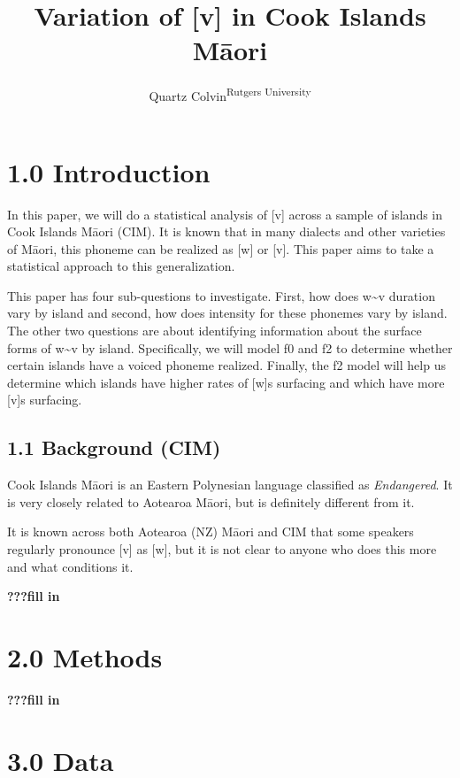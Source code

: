\documentclass[
  ,man,floatsintext]{apa6}
\title{Variation of {[}v{]} in Cook Islands Māori}
\author{Quartz Colvin\textsuperscript{Rutgers University}}
\date{}
\affiliation{\phantom{0}}
\begin{document}
\maketitle

\section{1.0 Introduction}\label{introduction}

In this paper, we will do a statistical analysis of {[}v{]} across a sample of islands in Cook Islands Māori (CIM). It is known that in many dialects and other varieties of Māori, this phoneme can be realized as {[}w{]} or {[}v{]}. This paper aims to take a statistical approach to this generalization.

This paper has four sub-questions to investigate. First, how does w\textasciitilde v duration vary by island and second, how does intensity for these phonemes vary by island. The other two questions are about identifying information about the surface forms of w\textasciitilde v by island. Specifically, we will model f0 and f2 to determine whether certain islands have a voiced phoneme realized. Finally, the f2 model will help us determine which islands have higher rates of {[}w{]}s surfacing and which have more {[}v{]}s surfacing.

\subsection{1.1 Background (CIM)}\label{background-cim}

Cook Islands Māori is an Eastern Polynesian language classified as \emph{Endangered}. It is very closely related to Aotearoa Māori, but is definitely different from it.

It is known across both Aotearoa (NZ) Māori and CIM that some speakers regularly pronounce {[}v{]} as {[}w{]}, but it is not clear to anyone who does this more and what conditions it.

\textbf{???fill in}

\section{2.0 Methods}\label{methods}

\textbf{???fill in}

\section{3.0 Data}\label{data}
\end{document}
